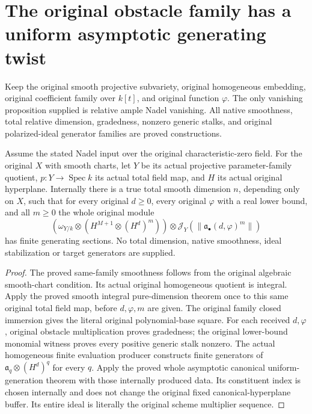 \section{The original obstacle family has a uniform asymptotic generating twist}

Keep the original smooth projective subvariety, original homogeneous
embedding, original coefficient family over $k[t]$, and original function
$\varphi$. The only vanishing proposition supplied is relative ample
Nadel vanishing. All native smoothness, total relative dimension,
gradedness, nonzero generic stalks, and original polarized-ideal generator
families are proved constructions.

\begin{theorem}
\label{thm:c0n-original-asymptotic-canonical-generators}
\leanok
{}
Assume the stated Nadel input over the original characteristic-zero field.
For the original $X$ with smooth charts, let $Y$ be its actual projective
parameter-family quotient, $p:Y\to\operatorname{Spec}k$ its actual total
field map, and $H$ its actual original hyperplane. Internally there is a
true total smooth dimension $n$, depending only on $X$, such that for every
original $d\geq0$, every original $\varphi$ with a real lower bound, and
all $m\geq0$ the whole original module
\[
 (\omega_{Y/k}\otimes(H^{M+1}\otimes(H^d)^m))\otimes
     \mathcal J_Y(\|\mathfrak a_\bullet(d,\varphi)^m\|)
\]
has finite generating sections. No total dimension, native smoothness,
ideal stabilization or target generators are supplied.
\end{theorem}
\begin{proof}
The proved same-family smoothness follows from the original algebraic
smooth-chart condition. Its actual original homogeneous quotient is
integral. Apply the proved smooth integral pure-dimension theorem once
to this same original total field map, before $d,\varphi,m$ are given.
The original family closed immersion gives the literal original
polynomial-base square. For each received $d,\varphi$, original obstacle
multiplication proves gradedness; the original lower-bound monomial
witness proves every positive generic stalk nonzero. The actual
homogeneous finite evaluation producer constructs finite generators of
$\mathfrak a_q\otimes(H^d)^q$ for every $q$. Apply the proved whole
asymptotic canonical uniform-generation theorem with those internally
produced data. Its constituent index is chosen internally and does not
change the original fixed canonical-hyperplane buffer. Its entire ideal
is literally the original scheme multiplier sequence.
\end{proof}

